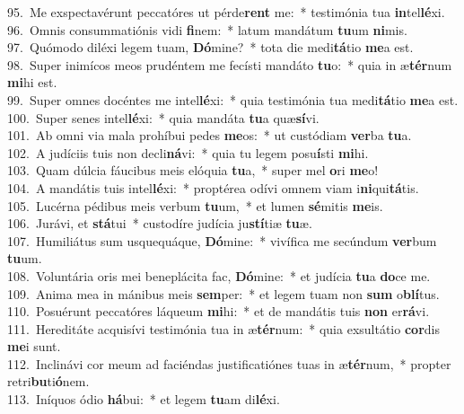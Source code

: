{95.~}Me exspectavérunt peccatóres ut pérde\textbf{rent} me:~* testimónia tua \textbf{in}tel\textbf{lé}xi.\\
{96.~}Omnis consummatiónis vidi \textbf{fi}nem:~* latum mandátum \textbf{tu}um \textbf{ni}mis.\\
{97.~}Quómodo diléxi legem tuam, \textbf{Dó}mine?~* tota die medi\textbf{tá}tio \textbf{me}a est.\\
{98.~}Super inimícos meos prudéntem me fecísti mandáto \textbf{tu}o:~* quia in æ\textbf{tér}num \textbf{mi}hi est.\\
{99.~}Super omnes docéntes me intel\textbf{lé}xi:~* quia testimónia tua medi\textbf{tá}tio \textbf{me}a est.\\
{100.~}Super senes intel\textbf{lé}xi:~* quia mandáta \textbf{tu}a quæ\textbf{sí}vi.\\
{101.~}Ab omni via mala prohíbui pedes \textbf{me}os:~* ut custódiam \textbf{ver}ba \textbf{tu}a.\\
{102.~}A judíciis tuis non decli\textbf{ná}vi:~* quia tu legem posu\textbf{í}sti \textbf{mi}hi.\\
{103.~}Quam dúlcia fáucibus meis elóquia \textbf{tu}a,~* super mel \textbf{o}ri \textbf{me}o!\\
{104.~}A mandátis tuis intel\textbf{lé}xi:~* proptérea odívi omnem viam i\textbf{ni}qui\textbf{tá}tis.\\
{105.~}Lucérna pédibus meis verbum \textbf{tu}um,~* et lumen \textbf{sé}mitis \textbf{me}is.\\
{106.~}Jurávi, et \textbf{stá}tui~* custodíre judícia ju\textbf{stí}tiæ \textbf{tu}æ.\\
{107.~}Humiliátus sum usquequáque, \textbf{Dó}mine:~* vivífica me secúndum \textbf{ver}bum \textbf{tu}um.\\
{108.~}Voluntária oris mei beneplácita fac, \textbf{Dó}mine:~* et judícia \textbf{tu}a \textbf{do}ce me.\\
{109.~}Anima mea in mánibus meis \textbf{sem}per:~* et legem tuam non \textbf{sum} o\textbf{blí}tus.\\
{110.~}Posuérunt peccatóres láqueum \textbf{mi}hi:~* et de mandátis tuis \textbf{non} er\textbf{rá}vi.\\
{111.~}Hereditáte acquisívi testimónia tua in æ\textbf{tér}num:~* quia exsultátio \textbf{cor}dis \textbf{me}i sunt.\\
{112.~}Inclinávi cor meum ad faciéndas justificatiónes tuas in æ\textbf{tér}num,~* propter retri\textbf{bu}ti\textbf{ó}nem.\\
{113.~}Iníquos ódio \textbf{há}bui:~* et legem \textbf{tu}am di\textbf{lé}xi.\\
